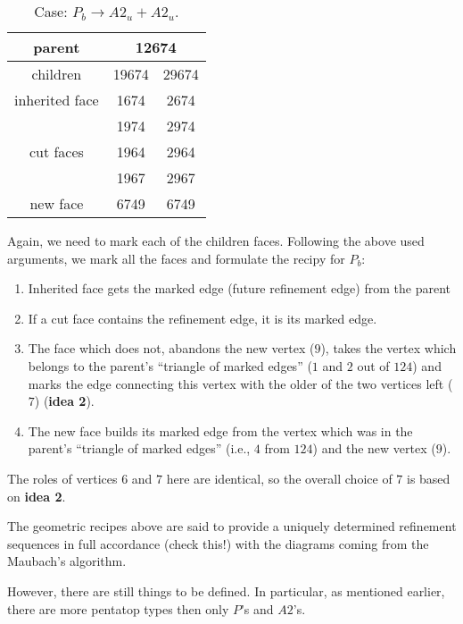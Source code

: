 \documentclass[a4paper,12pt]{amsart}
\numberwithin{equation}{section}
\begin{document}
\begin{itemize}
	\begin{table}[h!]
	\caption{Case: $P_b \rightarrow A2_u + A2_u$.}
	\label{tab:Case4}
	\begin{tabular}{|c|c|c|} \hline
	parent & \multicolumn{2}{|c|}{12674} \\ \hline
	children & 19674 & 29674 \\ \hline
	inherited face & 1674 & 2674 \\ \hline
	\multirow{3}{*}{cut faces} & 1974 & 2974 \\ 
	 & 1964 & 2964 \\ 
	 & 1967 & 2967 \\ \hline
	 new face & 6749 & 6749 \\ \hline
	\end{tabular}
	\end{table}    
    Again, we need to mark each of the children faces. 
    Following the above used arguments, we mark all the faces and formulate the recipy for $P_b$:
    
    	\begin{enumerate}
		\item Inherited face gets the marked edge (future refinement edge) from the parent
		\item If a cut face contains the refinement edge, it is its marked edge.
		\item The face which does not, abandons the new vertex ($9$), takes the vertex which belongs to the parent's ``triangle of marked edges'' ($1$ and $2$ out of $124$) and marks the edge connecting this vertex with the older of the two vertices left ($7$) (\textbf{idea 2}).
		\item The new face builds its marked edge from the vertex which was in the parent's ``triangle of marked edges'' (i.e., $4$ from $124$)  and the new vertex ($9$).
	\end{enumerate}
	
	The roles of vertices $6$ and $7$ here are identical, so the overall choice of $7$ is based on \textbf{idea 2}.

\end{itemize}
 
The geometric recipes above are said to provide a uniquely determined refinement sequences in full accordance (check this!) with the diagrams coming from the Maubach's algorithm.

However, there are still things to be defined. In particular, as mentioned earlier, there are more pentatop types then only $P$'s and $A2$'s.
\end{document}
